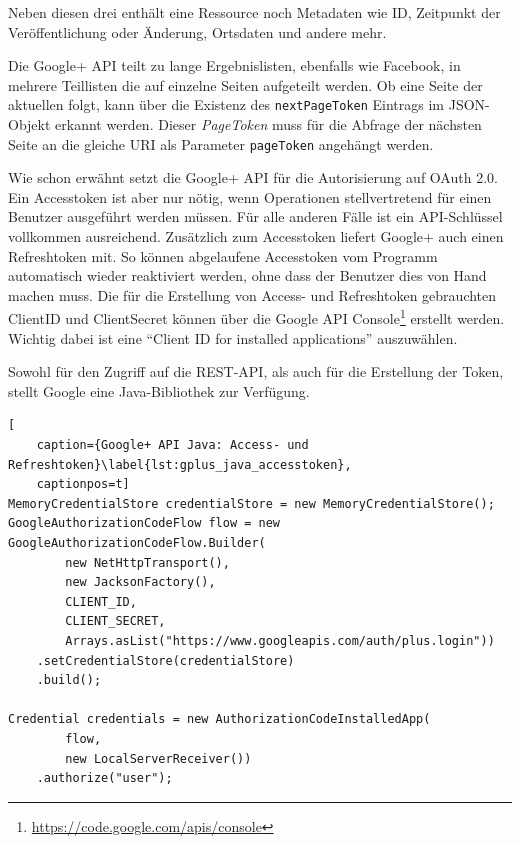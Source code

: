 Neben diesen drei enthält eine Ressource noch Metadaten wie ID, Zeitpunkt der Veröffentlichung oder Änderung, Ortsdaten und andere mehr.

Die Google+ API teilt zu lange Ergebnislisten, ebenfalls wie Facebook, in mehrere Teillisten die auf einzelne Seiten aufgeteilt werden. Ob eine Seite der aktuellen folgt, kann über die Existenz des \texttt{nextPageToken} Eintrags im JSON-Objekt erkannt werden. Dieser \emph{PageToken} muss für die Abfrage der nächsten Seite an die gleiche URI als Parameter \texttt{pageToken} angehängt werden. 

Wie schon erwähnt setzt die Google+ API für die Autorisierung auf OAuth 2.0. Ein Accesstoken ist aber nur nötig, wenn Operationen stellvertretend für einen Benutzer ausgeführt werden müssen. Für alle anderen Fälle ist ein API-Schlüssel vollkommen ausreichend. Zusätzlich zum Accesstoken liefert Google+ auch einen Refreshtoken mit. So können abgelaufene Accesstoken vom Programm automatisch wieder reaktiviert werden, ohne dass der Benutzer dies von Hand machen muss. Die für die Erstellung von Access- und Refreshtoken gebrauchten ClientID und ClientSecret können über die Google API Console\footnote{\url{https://code.google.com/apis/console}} erstellt werden. Wichtig dabei ist eine \enquote{Client ID for installed applications} auszuwählen. 

Sowohl für den Zugriff auf die REST-API, als auch für die Erstellung der Token, stellt Google eine Java-Bibliothek zur Verfügung. 

\begin{lstlisting}[
    caption={Google+ API Java: Access- und Refreshtoken}\label{lst:gplus_java_accesstoken},
    captionpos=t]
MemoryCredentialStore credentialStore = new MemoryCredentialStore();
GoogleAuthorizationCodeFlow flow = new GoogleAuthorizationCodeFlow.Builder(
        new NetHttpTransport(),
        new JacksonFactory(),
        CLIENT_ID,
        CLIENT_SECRET,
        Arrays.asList("https://www.googleapis.com/auth/plus.login"))
    .setCredentialStore(credentialStore)
    .build();

Credential credentials = new AuthorizationCodeInstalledApp(
        flow,
        new LocalServerReceiver())
    .authorize("user");
\end{lstlisting}

